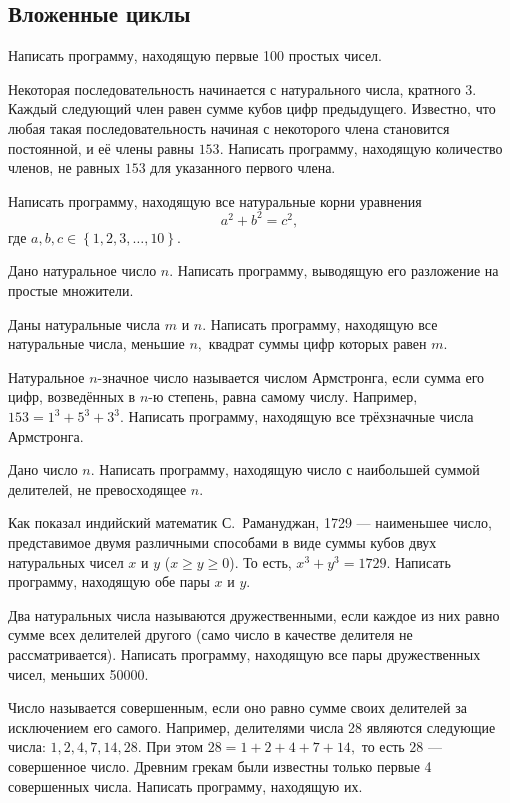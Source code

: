 \subsection{Вложенные циклы}

\task Написать программу, находящую первые 100 простых чисел.

\task Некоторая последовательность начинается с натурального числа,
кратного 3. Каждый следующий член равен сумме кубов цифр
предыдущего. Известно, что любая такая последовательность начиная с
некоторого члена становится постоянной, и её члены равны
$153$. Написать программу, находящую количество членов, не равных $153$
для указанного первого члена.

\task Написать программу, находящую все натуральные корни уравнения
\[
a^2+b^2=c^2,
\]
где $a, b, c \in \left\{1, 2, 3, \ldots, 10\right\}.$

\task Дано натуральное число $n$. Написать программу, выводящую его
разложение на простые множители.

\task Даны натуральные числа $m$ и $n$. Написать программу, находящую
все натуральные числа, меньшие $n,$ квадрат суммы цифр которых равен
$m$.

\task Натуральное $n$-значное число называется числом Армстронга, если
сумма его цифр, возведённых в $n$-ю степень, равна самому
числу. Например, $153 = 1^3 + 5^3 + 3^3$. Написать программу,
находящую все трёхзначные числа Армстронга.

\task Дано число $n$. Написать программу, находящую число с наибольшей
суммой делителей, не превосходящее $n$.

\task Как показал индийский математик С.~Рамануджан, 1729 — наименьшее
число, представимое двумя различными способами в виде суммы кубов двух
натуральных чисел $x$ и $y$ ($x\geqslant y\geqslant 0$).  То есть,
$x^3+y^3=1729$. Написать программу, находящую обе пары $x$ и $y$.

\task Два натуральных числа называются дружественными, если каждое из
них равно сумме всех делителей другого (само число в качестве делителя
не рассматривается). Написать программу, находящую все пары
дружественных чисел, меньших 50000.

\task Число называется совершенным, если оно равно сумме своих
делителей за исключением его самого. Например, делителями числа 28
являются следующие числа: $1, 2, 4, 7, 14, 28.$ При этом $28 =
1+2+4+7+14,$ то есть $28$ — совершенное число. Древним грекам были
известны только первые 4 совершенных числа. Написать программу,
находящую их.

